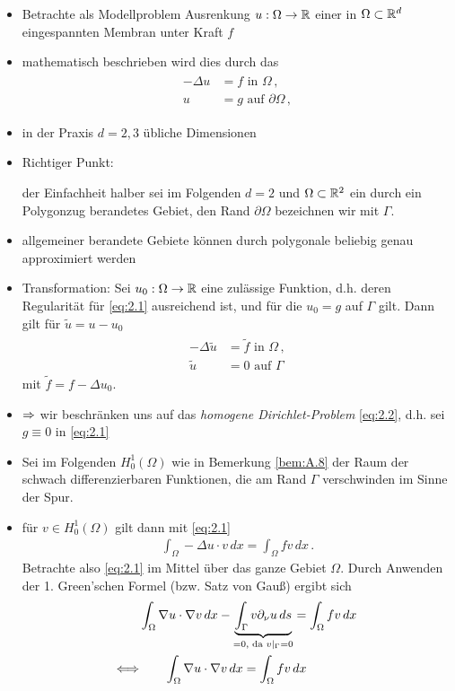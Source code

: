 \begin{itemize}
\item Betrachte als Modellproblem Ausrenkung $u: \Omega \rightarrow \mathbb{R}$ einer in $\Omega \subset \mathbb{R}^d$ eingespannten Membran unter Kraft $f$
\item mathematisch beschrieben wird dies durch das \textit{}
\begin{align}\label{eq:2.1}
\begin{aligned}
	-\Delta u &= f \text{ in } \Omega \, ,\\
	u & = g \text{ auf } \partial \Omega \, ,
\end{aligned}
\end{align}
\item in der Praxis $d = 2,3$ übliche Dimensionen
\item Richtiger Punkt: \begin{notation} 
der Einfachheit halber sei im Folgenden $d = 2$ und $\Omega \subset \mathbb{R}^2$ ein durch ein Polygonzug berandetes Gebiet, den Rand $\partial \Omega$ bezeichnen wir mit $\Gamma$.
\end{notation}
\item allgemeiner berandete Gebiete können durch polygonale beliebig genau approximiert werden
\item Transformation: Sei $u_0: \Omega \rightarrow \mathbb{R}$ eine zulässige Funktion, d.h. deren Regularität für \eqref{eq:2.1} ausreichend ist, und für die $u_0 = g$ auf $\Gamma$ gilt. Dann gilt für 
$\tilde u = u-u_0$
\begin{align}\label{eq:2.2}
\begin{aligned}
	-\Delta \tilde u &= \tilde f \text{ in } \Omega \, ,\\
	\tilde u & = 0 \text{ auf } \Gamma 
\end{aligned}
\end{align}
mit $\tilde f = f-\Delta u_0$.
\item $\Rightarrow$ wir beschränken uns auf das \textit{homogene Dirichlet-Problem} \eqref{eq:2.2}, d.h. sei $g\equiv 0$ in \eqref{eq:2.1}
\item Sei im Folgenden $H^1_0 (\Omega)$ wie in Bemerkung \ref{bem:A.8} der Raum der schwach differenzierbaren Funktionen, die am Rand $\Gamma$ verschwinden im Sinne der Spur.
\item für $v \in H^1_0(\Omega)$ gilt dann mit \eqref{eq:2.1}
\begin{align*}
	\int_\Omega -\Delta u \cdot v \, dx = \int_\Omega f v \, dx \, .
\end{align*}
Betrachte also \eqref{eq:2.1} im Mittel über das ganze Gebiet $\Omega$. Durch Anwenden der 1. Green'schen Formel (bzw. Satz von Gauß) ergibt sich
\begin{align}
\notag	& \int_\Omega \nabla u \cdot \nabla v \, dx -\underbrace{\int_\Gamma v \partial_\nu u \, ds}_{=0, \text{ da } v|_\Gamma = 0} = \int_\Omega f v \, dx \, \\
\label{eq:2.3}	\Longleftrightarrow & \qquad \int_\Omega \nabla u \cdot \nabla v \, dx =\int_\Omega f v \, dx
\end{align}
\end{itemize}



